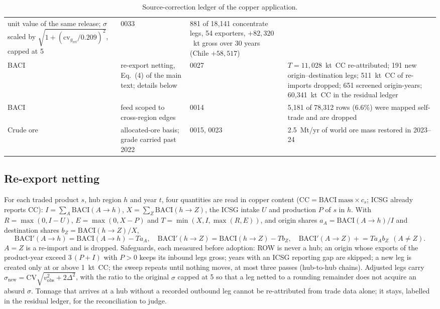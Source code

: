 \documentclass[11pt]{article}
\begin{document}
\begin{table}[h]
\begin{tabular}{@{}p{1.3cm}p{5.4cm}p{1.1cm}p{6.4cm}@{}}
unit value of the same release; $\sigma$ scaled by $\sqrt{1 +
(\mathrm{cv}_{g_{\mathrm{ref}}}/0.209)^2}$, capped at 5 & 0033 & 881 of
18{,}141 concentrate legs, 54 exporters, $+82{,}320$~kt gross over 30 years
(Chile $+58{,}517$) \\
BACI & re-export netting, Eq.~(4) of the main text; details below & 0027 &
$T = 11{,}028$~kt~CC re-attributed; 191 new origin--destination legs; 511~kt~CC
of re-imports dropped; 651 screened origin-years; 60{,}341~kt~CC in the
residual ledger \\
BACI & feed scoped to cross-region edges & 0014 & 5{,}181 of 78{,}312
rows (6.6\%) were mapped self-trade and are dropped \\
Crude ore & allocated-ore basis; grade carried past 2022 & 0015, 0023 &
2.5~Mt/yr of world ore mass restored in 2023--24 \\
\bottomrule
\end{tabular}
\caption{Source-correction ledger of the copper application.}
\label{tab:si-ledger}
\end{table}

\subsection{Re-export netting}
For each traded product $s$, hub region $h$ and year $t$, four quantities are
read in copper content ($\mathrm{CC} = \mathrm{BACI\ mass} \times c_s$; ICSG
already reports CC): $I = \sum_A \mathrm{BACI}(A \to h)$, $X = \sum_Z
\mathrm{BACI}(h \to Z)$, the ICSG intake $U$ and production $P$ of $s$ in
$h$. With $R = \max(0, I - U)$, $E = \max(0, X - P)$ and $T = \min(X, I,
\max(R, E))$, and origin shares $a_A = \mathrm{BACI}(A \to h)/I$ and
destination shares $b_Z = \mathrm{BACI}(h \to Z)/X$,
\begin{equation}
\mathrm{BACI}'(A \to h) = \mathrm{BACI}(A \to h) - T a_A,\quad
\mathrm{BACI}'(h \to Z) = \mathrm{BACI}(h \to Z) - T b_Z,\quad
\mathrm{BACI}'(A \to Z) \mathrel{+}= T a_A b_Z \ \ (A \ne Z).
\end{equation}
$A = Z$ is a re-import and is dropped. Safeguards, each measured before
adoption: ROW is never a hub; an origin whose exports of the product-year
exceed $3\,(P + I)$ with $P > 0$ keeps its inbound legs gross; years with an
ICSG reporting gap are skipped; a new leg is created only at or above
1~kt~CC; the sweep repeats until nothing moves, at most three passes
(hub-to-hub chains). Adjusted legs carry $\sigma_{\mathrm{new}} =
\mathrm{CV}\sqrt{v_{\mathrm{obs}}^2 + 2\Delta^2}$, with the ratio to the
original $\sigma$ capped at 5 so that a leg netted to a rounding remainder
does not acquire an absurd $\sigma$. Tonnage that arrives at a hub without a
recorded outbound leg cannot be re-attributed from trade data alone; it
stays, labelled in the residual ledger, for the reconciliation to judge.
\end{document}
